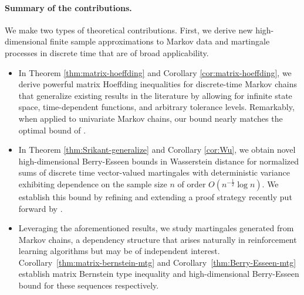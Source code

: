 
\paragraph{Summary of the contributions.}
We make two types of theoretical contributions. First, we derive new high-dimensional finite sample approximations to Markov data and martingale processes in discrete time that are of broad applicability.
\begin{itemize}
    \setlength{\itemsep}{0pt}
\item In Theorem \ref{thm:matrix-hoeffding} and Corollary \ref{cor:matrix-hoeffding}, we derive powerful matrix Hoeffding inequalities for discrete-time Markov chains that generalize existing results in the literature \citep[see, e.g.][]{garg2018matrixexpanderchernoff, qiu2020matrix} by allowing for infinite state space, time-dependent functions, and arbitrary tolerance levels. Remarkably, when applied to univariate Markov chains, our bound nearly matches the optimal bound of \cite{Fan2021Hoeffding}.

\item In Theorem \ref{thm:Srikant-generalize} and Corollary \ref{cor:Wu}, we obtain novel high-dimensional  Berry-Esseen bounds in Wasserstein distance for normalized sums of discrete time vector-valued martingales with deterministic variance exhibiting dependence on the sample size $n$ of order $O(n^{-\frac{1}{2}}\log n)$. We establish this bound by refining and extending a proof strategy recently put forward by \cite{srikant2024rates}. %

\item Leveraging the aforementioned results, we study martingales generated from Markov chains, a dependency structure that arises naturally in reinforcement learning algorithms but may be of independent interest. Corollary~\ref{thm:matrix-bernstein-mtg} and Corollary~\ref{thm:Berry-Esseen-mtg} establish matrix Bernstein type inequality and high-dimensional Berry-Esseen bound for these sequences respectively. 
\end{itemize}


